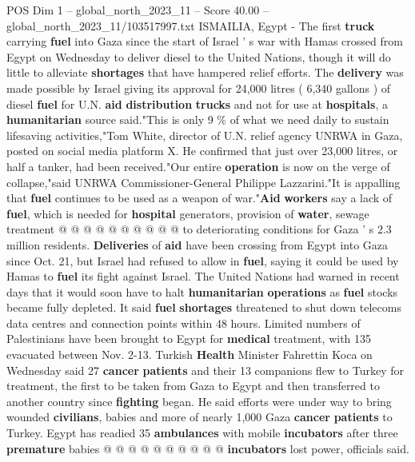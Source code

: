 \begin{textsample}{POS Dim 1 – global\_north\_2023\_11 – Score 40.00 – global\_north\_2023\_11/103517997.txt}  \label{ex:f1_pos_255}
ISMAILIA, Egypt - The first \textbf{truck} carrying \textbf{fuel} into Gaza since the start of Israel ' s war with Hamas crossed from Egypt on Wednesday to deliver diesel to the United Nations, though it will do little to alleviate \textbf{shortages} that have hampered relief efforts.
The \textbf{delivery} was made possible by Israel giving its approval for 24,000 litres ( 6,340 gallons ) of diesel \textbf{fuel} for U.N. \textbf{aid} \textbf{distribution} \textbf{trucks} and not for use at \textbf{hospitals}, a \textbf{humanitarian} source said."This is only 9 \% of what we need daily to sustain lifesaving activities,"Tom White, director of U.N. relief agency UNRWA in Gaza, posted on social media platform X.
He confirmed that just over 23,000 litres, or half a tanker, had been received."Our entire \textbf{operation} is now on the verge of collapse,"said UNRWA Commissioner-General Philippe Lazzarini."It is appalling that \textbf{fuel} continues to be used as a weapon of war."\textbf{Aid} \textbf{workers} say a lack of \textbf{fuel}, which is needed for \textbf{hospital} generators, provision of \textbf{water}, sewage treatment @ @ @ @ @ @ @ @ @ @ to deteriorating conditions for Gaza ' s 2.3 million residents. \textbf{Deliveries} of \textbf{aid} have been crossing from Egypt into Gaza since Oct. 21, but Israel had refused to allow in \textbf{fuel}, saying it could be used by Hamas to \textbf{fuel} its fight against Israel.
The United Nations had warned in recent days that it would soon have to halt \textbf{humanitarian} \textbf{operations} as \textbf{fuel} stocks became fully depleted.
It said \textbf{fuel} \textbf{shortages} threatened to shut down telecoms data centres and connection points within 48 hours.
Limited numbers of Palestinians have been brought to Egypt for \textbf{medical} treatment, with 135 evacuated between Nov. 2-13.
Turkish \textbf{Health} Minister Fahrettin Koca on Wednesday said 27 \textbf{cancer} \textbf{patients} and their 13 companions flew to Turkey for treatment, the first to be taken from Gaza to Egypt and then transferred to another country since \textbf{fighting} began.
He said efforts were under way to bring wounded \textbf{civilians}, babies and more of nearly 1,000 Gaza \textbf{cancer} \textbf{patients} to Turkey.
Egypt has readied 35 \textbf{ambulances} with mobile \textbf{incubators} after three \textbf{premature} babies @ @ @ @ @ @ @ @ @ @ \textbf{incubators} lost power, officials said.

\end{textsample}
